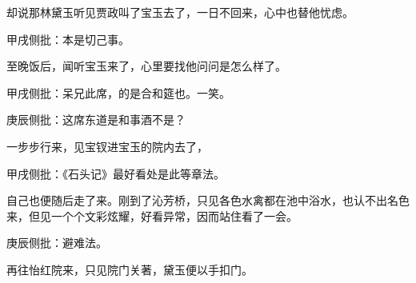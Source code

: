 \begin{parag}


    却说那林黛玉听见贾政叫了宝玉去了，一日不回来，心中也替他忧虑。\begin{note}甲戌侧批：本是切己事。\end{note}至晚饭后，闻听宝玉来了，心里要找他问问是怎么样了。\begin{note}甲戌侧批：呆兄此席，的是合和筵也。一笑。\end{note}\begin{note}庚辰侧批：这席东道是和事酒不是？\end{note}一步步行来，见宝钗进宝玉的院内去了，\begin{note}甲戌侧批：《石头记》最好看处是此等章法。\end{note}自己也便随后走了来。刚到了沁芳桥，只见各色水禽都在池中浴水，也认不出名色来，但见一个个文彩炫耀，好看异常，因而站住看了一会。\begin{note}庚辰侧批：避难法。\end{note}再往怡红院来，只见院门关著，黛玉便以手扣门。
\end{parag}


